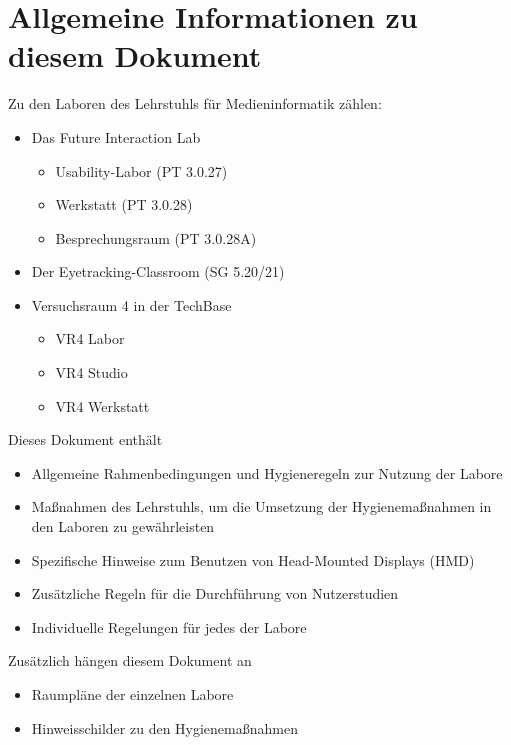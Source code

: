 \section{Allgemeine Informationen zu diesem Dokument}

{
\singlespacing

Zu den Laboren des Lehrstuhls für Medieninformatik zählen:

\begin{itemize}
    \item Das Future Interaction Lab
    \begin{itemize}
        \item Usability-Labor (PT 3.0.27)
        \item Werkstatt (PT 3.0.28)
        \item Besprechungsraum (PT 3.0.28A)
    \end{itemize}
    \item Der Eyetracking-Classroom (SG 5.20/21)
    \item Versuchsraum 4 in der TechBase
    \begin{itemize}
        \item VR4 Labor
        \item VR4 Studio
        \item VR4 Werkstatt
    \end{itemize}
\end{itemize}

\bigskip
\noindent
Dieses Dokument enthält

\begin{itemize}
    \item Allgemeine Rahmenbedingungen und Hygieneregeln zur Nutzung der Labore
    \item Maßnahmen des Lehrstuhls, um die Umsetzung der Hygienemaßnahmen in den Laboren zu gewährleisten
    \item Spezifische Hinweise zum Benutzen von Head-Mounted Displays (HMD)
    \item Zusätzliche Regeln für die Durchführung von Nutzerstudien
    \item Individuelle Regelungen für jedes der Labore
\end{itemize}

\bigskip
\noindent
Zusätzlich hängen diesem Dokument an

\begin{itemize}
    \item Raumpläne der einzelnen Labore
    \item Hinweisschilder zu den Hygienemaßnahmen
\end{itemize}

}
